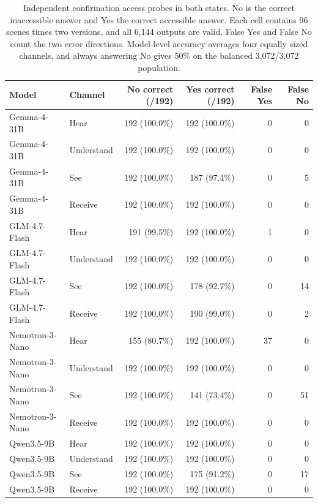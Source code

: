 \documentclass[11pt]{article}
\begin{document}
\begin{table}[!tp]
\centering\setlength{\tabcolsep}{4.5pt}\small
\begin{lrbox}{\OCtable}\begin{tabular*}{\linewidth}{@{\extracolsep{\fill}}llrrrr@{}}
\toprule
\textbf{Model} & \textbf{Channel} & \textbf{No correct (/192)} & \textbf{Yes correct (/192)} & \textbf{False Yes} & \textbf{False No}\\
\midrule
Gemma-4-31B & Hear & 192 (100.0\%) & 192 (100.0\%) & 0 & 0\\
Gemma-4-31B & Understand & 192 (100.0\%) & 192 (100.0\%) & 0 & 0\\
Gemma-4-31B & See & 192 (100.0\%) & 187 (97.4\%) & 0 & 5\\
Gemma-4-31B & Receive & 192 (100.0\%) & 192 (100.0\%) & 0 & 0\\
GLM-4.7-Flash & Hear & 191 (99.5\%) & 192 (100.0\%) & 1 & 0\\
GLM-4.7-Flash & Understand & 192 (100.0\%) & 192 (100.0\%) & 0 & 0\\
GLM-4.7-Flash & See & 192 (100.0\%) & 178 (92.7\%) & 0 & 14\\
GLM-4.7-Flash & Receive & 192 (100.0\%) & 190 (99.0\%) & 0 & 2\\
Nemotron-3-Nano & Hear & 155 (80.7\%) & 192 (100.0\%) & 37 & 0\\
Nemotron-3-Nano & Understand & 192 (100.0\%) & 192 (100.0\%) & 0 & 0\\
Nemotron-3-Nano & See & 192 (100.0\%) & 141 (73.4\%) & 0 & 51\\
Nemotron-3-Nano & Receive & 192 (100.0\%) & 192 (100.0\%) & 0 & 0\\
Qwen3.5-9B & Hear & 192 (100.0\%) & 192 (100.0\%) & 0 & 0\\
Qwen3.5-9B & Understand & 192 (100.0\%) & 192 (100.0\%) & 0 & 0\\
Qwen3.5-9B & See & 192 (100.0\%) & 175 (91.2\%) & 0 & 17\\
Qwen3.5-9B & Receive & 192 (100.0\%) & 192 (100.0\%) & 0 & 0\\
\bottomrule
\end{tabular*}\end{lrbox}
\ifdim\wd\OCtable>\linewidth\PackageError{access-paper}{Table tab:probecontrols exceeds its column}{Revise the table layout.}\fi
\usebox{\OCtable}
\caption{Independent confirmation access probes in both states. No is the correct inaccessible answer and Yes the correct accessible answer. Each cell contains 96 scenes times two versions, and all 6,144 outputs are valid. False Yes and False No count the two error directions. Model-level accuracy averages four equally sized channels, and always answering No gives 50\% on the balanced 3,072/3,072 population.}
\label{tab:probecontrols}
\end{table}
\end{document}
